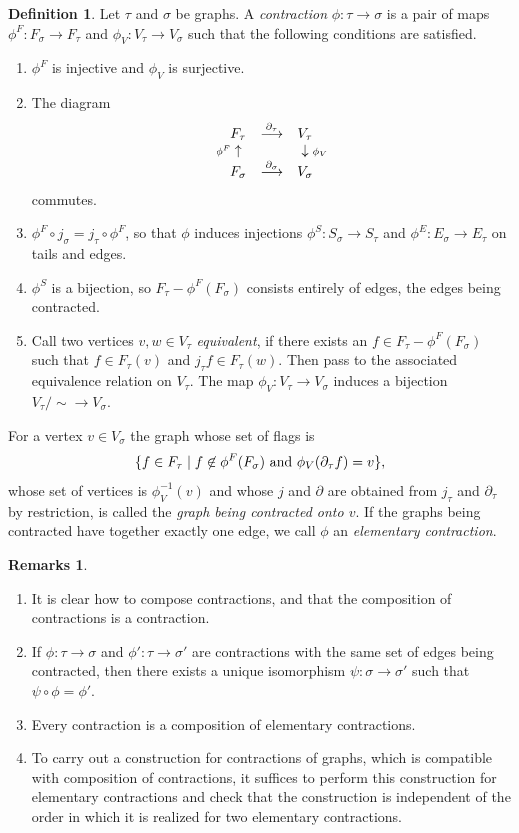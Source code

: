 \documentclass[11pt]{amsart}
\theoremstyle{definition}
\newtheorem{defn}[prop]{Definition}
\newtheorem{numrmks}[prop]{Remarks}
\theoremstyle{remark}
\newcommand{\rtext}[1]{\text{\upshape #1}}
\newcommand{\del}{\partial}
\renewcommand{\st}{\mathrel{\mid}}
\newcommand{\comp}{\mathbin{{\scriptstyle\circ}}}
\newcommand{\ldiagup}[1]
       {\makebox[0cm]{\({\scriptstyle#1}\uparrow\phantom{\scriptstyle#1}\)}}
\newcommand{\rdiag}[1]
       {\makebox[0cm]{\(\phantom{\scriptstyle#1}\downarrow{\scriptstyle#1}\)}}
\renewcommand{\t}{_{\tau}}
\newcommand{\s}{_{\sigma}}
\theoremstyle{plain}
\theoremstyle{definition}
\theoremstyle{remark}
\begin{document}
\begin{defn} \label{doc}
Let \(\tau\) and \(\sigma\) be graphs. A {\em contraction
}\(\phi:\tau\rightarrow\sigma\) is a pair of maps
\(\phi^F:F\s\rightarrow F\t\) and \(\phi_V:V\t\rightarrow V\s\) such that the
following conditions are satisfied.
\begin{enumerate}
\item \(\phi^F\) is injective and \(\phi_V\) is surjective.
\item The diagram
\[
\begin{array}{ccc}
F\t & \stackrel{\del\t}{\longrightarrow} & V\t \\
\ldiagup{\phi^F} & & \rdiag{\phi_V} \\
F\s & \stackrel{\del\s}{\longrightarrow} & V\s
\end{array}
\]
commutes.
\item \(\phi^F\comp j\s =j\t\comp \phi^F\), so that \(\phi\) induces injections
\(\phi^S:S\s\rightarrow S\t\) and
\(\phi^E:E\s\rightarrow E\t\) on tails and edges.
\item \(\phi^S\) is a bijection, so \(F\t-\phi^F(F\s)\) consists entirely of edges,
the edges being contracted.
\item Call two vertices \(v,w\in V\t\) {\em equivalent}, if there exists an \(f\in
F\t-\phi^F(F\s)\) such that \(f\in F\t(v)\)
and \(j\t f\in F\t(w)\). Then pass to the associated equivalence relation on
\(V\t\). The map \(\phi_V:V\t\rightarrow V\s\)
induces a bijection \(V\t/\mathop{\sim}\rightarrow V\s\).
\end{enumerate}
For a vertex \(v\in V\s\) the graph whose set of flags is
\[
\{f\in F\t\st \rtext{\(f\not\in\phi^F(F\s)\) and \(\phi_V(\del\t f)=v\)}\},
\]
whose set of vertices is \(\phi_V^{-1}(v)\) and whose \(j\) and \(\del\) are obtained
from \(j\t\) and \(\del\t\) by restriction,
is called the {\em graph being contracted onto \(v\)}. If the graphs being
contracted have together exactly one edge, we
call \(\phi\) an {\em elementary contraction}.
\end{defn}

\begin{numrmks} \label{rmc}
\begin{enumerate}
\item It is clear how to compose contractions, and that the composition of
contractions is a contraction.
\item If \(\phi:\tau\rightarrow\sigma\) and \(\phi':\tau\rightarrow\sigma'\) are
contractions with the same set of edges
being contracted, then there exists a unique isomorphism
\(\psi:\sigma\rightarrow\sigma'\) such that
\(\psi\comp\phi=\phi'\).
\item Every contraction is a composition of elementary contractions.
\item \label{rmcone} To carry out a construction for contractions of graphs,
which is compatible with composition of
contractions, it suffices to perform this construction for elementary
contractions and check that the construction is
independent of the order in which it is realized for two elementary
contractions.
\end{enumerate}
\end{numrmks}
\end{document}
